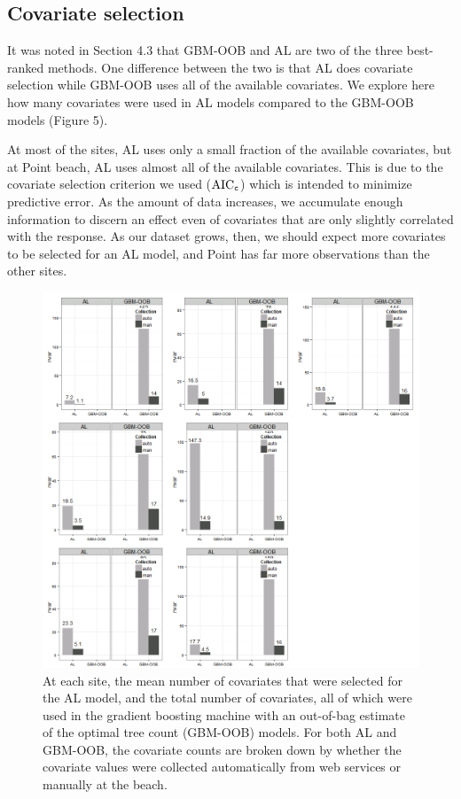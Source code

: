 \documentclass[authoryear,review, 12pt]{elsarticle}
\begin{document}
\subsection{Covariate selection}\label{covariate-selection}

It was noted in Section 4.3 that GBM-OOB and AL are two of the three
best-ranked methods. One difference between the two is that AL does
covariate selection while GBM-OOB uses all of the available covariates.
We explore here how many covariates were used in AL models compared to
the GBM-OOB models (Figure 5).

At most of the sites, AL uses only a small fraction of the available
covariates, but at Point beach, AL uses almost all of the available
covariates. This is due to the covariate selection criterion we used
(\(\text{AIC}_{\tt c}\)) which is intended to minimize predictive error.
As the amount of data increases, we accumulate enough information to
discern an effect even of covariates that are only slightly correlated
with the response. As our dataset grows, then, we should expect more
covariates to be selected for an AL model, and Point has far more
observations than the other sites.

\begin{figure}[htbp]
\centering
\includegraphics{figure/varselect-barchart.png}
\caption{At each site, the mean number of covariates that were selected
for the AL model, and the total number of covariates, all of which were
used in the gradient boosting machine with an out-of-bag estimate of the
optimal tree count (GBM-OOB) models. For both AL and GBM-OOB, the
covariate counts are broken down by whether the covariate values were
collected automatically from web services or manually at the beach.}
\end{figure}
\end{document}
